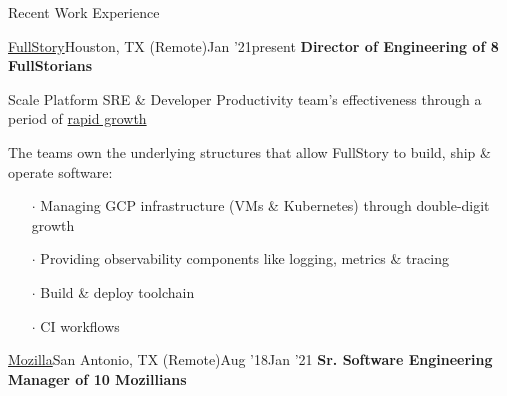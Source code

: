 \documentclass{resume} %
\begin{document}
\begin{rSection}{Recent Work Experience}


\begin{rSubsection}{\href{https://www.fullstory.com/}{FullStory}}{Houston, TX (Remote)}{Jan '21}{present}
  {\textbf{Director of Engineering of 8 FullStorians}}

\item Scale Platform SRE \& Developer Productivity team's effectiveness through a period of {\href{https://www.fullstory.com/blog/series-d-announcement/}{rapid growth}}
\item The teams own the underlying structures that allow FullStory to build, ship \& operate software:

  \vspace{-0.5em}
    \begin{itemize} \itemsep0.5pt \parskip0pt
    \item[$\cdot$] Managing GCP infrastructure (VMs \& Kubernetes) through double-digit growth
    \item[$\cdot$] Providing observability components like logging, metrics \& tracing
    \item[$\cdot$] Build \& deploy toolchain
    \item[$\cdot$] CI workflows
  \end{itemize}
    
    
\end{rSubsection}


\begin{rSubsection}{\href{https://www.mozilla.org/}{Mozilla}}{San Antonio, TX (Remote)}{Aug '18}{Jan '21}
  {\textbf{Sr. Software Engineering Manager of 10 Mozillians}}



\end{rSubsection}
\end{rSection}
\end{document}

